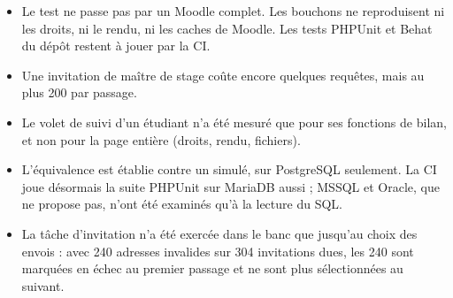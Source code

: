 \documentclass[11pt,a4paper]{article}
\newcommand{\code}[1]{\texttt{\detokenize{#1}}}
\begin{document}
\begin{itemize}
  \item Le test ne passe pas par un Moodle complet. Les bouchons ne reproduisent ni les droits,
    ni le rendu, ni les caches de Moodle. Les tests PHPUnit et Behat du dépôt restent à jouer
    par la CI.
  \item Une invitation de maître de stage coûte encore quelques requêtes, mais au plus 200 par
    passage.
  \item Le volet de suivi d'un étudiant n'a été mesuré que pour ses fonctions de bilan, et non
    pour la page entière (droits, rendu, fichiers).
  \item L'équivalence est établie contre un \code{$DB} simulé, sur PostgreSQL seulement. La CI
    joue désormais la suite PHPUnit sur MariaDB aussi ; MSSQL et Oracle, que
    \code{moodle-plugin-ci} ne propose pas, n'ont été examinés qu'à la lecture du SQL.
  \item La tâche d'invitation n'a été exercée dans le banc que jusqu'au choix des envois : avec
    240 adresses invalides sur 304 invitations dues, les 240 sont marquées en échec au premier
    passage et ne sont plus sélectionnées au suivant.
\end{itemize}
\end{document}
